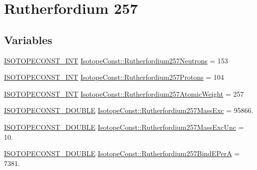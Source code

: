 \hypertarget{group___isotope_const-_rutherfordium-_rf257}{}\section{Rutherfordium 257}
\label{group___isotope_const-_rutherfordium-_rf257}
\subsection*{Variables}
\begin{DoxyCompactItemize}
\item 
\mbox{\hyperlink{group___isotope_const-_macros_ga5f18360b3e99483a35c32d789e62621c}{I\+S\+O\+T\+O\+P\+E\+C\+O\+N\+S\+T\+\_\+\+I\+NT}} \mbox{\hyperlink{group___isotope_const-_rutherfordium-_rf257_ga735e18cbd1e17f624acaa9d4fb945194}{Isotope\+Const\+::\+Rutherfordium257\+Neutrons}} = 153
\item 
\mbox{\hyperlink{group___isotope_const-_macros_ga5f18360b3e99483a35c32d789e62621c}{I\+S\+O\+T\+O\+P\+E\+C\+O\+N\+S\+T\+\_\+\+I\+NT}} \mbox{\hyperlink{group___isotope_const-_rutherfordium-_rf257_gaf69c1cc7690691362f0f392d7bae618a}{Isotope\+Const\+::\+Rutherfordium257\+Protons}} = 104
\item 
\mbox{\hyperlink{group___isotope_const-_macros_ga5f18360b3e99483a35c32d789e62621c}{I\+S\+O\+T\+O\+P\+E\+C\+O\+N\+S\+T\+\_\+\+I\+NT}} \mbox{\hyperlink{group___isotope_const-_rutherfordium-_rf257_gac30684515c68a42fa5930ffdb4f3115f}{Isotope\+Const\+::\+Rutherfordium257\+Atomic\+Weight}} = 257
\item 
\mbox{\hyperlink{group___isotope_const-_macros_ga8f45a7272ce02c0b4c65c44636ed719a}{I\+S\+O\+T\+O\+P\+E\+C\+O\+N\+S\+T\+\_\+\+D\+O\+U\+B\+LE}} \mbox{\hyperlink{group___isotope_const-_rutherfordium-_rf257_ga5f32a1c8179d985c2632f1894236a7a7}{Isotope\+Const\+::\+Rutherfordium257\+Mass\+Exc}} = 95866.
\item 
\mbox{\hyperlink{group___isotope_const-_macros_ga8f45a7272ce02c0b4c65c44636ed719a}{I\+S\+O\+T\+O\+P\+E\+C\+O\+N\+S\+T\+\_\+\+D\+O\+U\+B\+LE}} \mbox{\hyperlink{group___isotope_const-_rutherfordium-_rf257_ga28205e98e716a283130ce7b7c55b65a8}{Isotope\+Const\+::\+Rutherfordium257\+Mass\+Exc\+Unc}} = 10.
\item 
\mbox{\hyperlink{group___isotope_const-_macros_ga8f45a7272ce02c0b4c65c44636ed719a}{I\+S\+O\+T\+O\+P\+E\+C\+O\+N\+S\+T\+\_\+\+D\+O\+U\+B\+LE}} \mbox{\hyperlink{group___isotope_const-_rutherfordium-_rf257_ga90ff258ddd3ce8212403c826bfffb1e3}{Isotope\+Const\+::\+Rutherfordium257\+Bind\+E\+PerA}} = 7381.

\end{DoxyCompactItemize}
